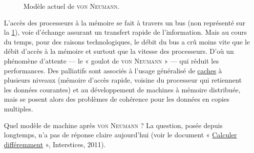 \begin{figure}[!hb]
	\vspace*{2pt}
	\caption{\label{fig:I.6}Modèle actuel de \textsc{von Neumann}.}
\end{figure}

L’accès des processeurs à la mémoire se fait à travers un bus (non représenté sur la \cref{fig:I.6}), voie d’échange assurant un transfert rapide de l’information. Mais au cours du temps, pour des raisons technologiques, le débit du bus a crû moins vite que le débit d’accès à la mémoire et surtout que la vitesse des processeurs. D’où un phénomène d’attente --- le « goulot de \textsc{von Neumann} » --- qui réduit les performances. Des palliatifs sont associés à l’usage généralisé de \href{https://interstices.info/et-plus-vite-si-affinites/}{caches} à plusieurs niveaux (mémoire d’accès rapide, voisine du processeur qui retiennent les données courantes) et au développement de machines à mémoire distribuée, mais se posent alors des problèmes de cohérence pour les données en copies multiples.

Quel modèle de machine après \textsc{von Neumann} ? La question, posée depuis longtemps, n’a pas de réponse claire aujourd’hui (voir le document « \href{https://interstices.info/calculer-differemment/}{Calculer différemment} », Interstices, 2011).

